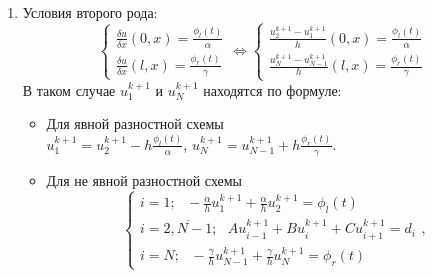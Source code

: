 \documentclass[12pt]{article}
\begin{document}
\begin{enumerate}
\begin{enumerate}
        \item Условия второго рода:
            \begin{equation*}
                \begin{cases}
                    \frac{\delta u}{\delta x}(0,x) = \frac{\phi_l(t)}{\alpha}
                    \\
                    \frac{\delta u}{\delta x}(l,x) = \frac{\phi_r(t)}{\gamma}
                \end{cases}
                \Leftrightarrow
                \begin{cases}
                    \frac{u_{2}^{k+1}-u_{1}^{k+1}}{h}(0,x) = \frac{\phi_l(t)}{\alpha}
                    \\
                    \frac{u_{N}^{k+1}-u_{N-1}^{k+1}}{h}(l,x) = \frac{\phi_r(t)}{\gamma}
                \end{cases}
            \end{equation*}
            В таком случае $u_1^{k+1}$ и $u_N^{k+1}$ находятся по формуле:
            \begin{itemize}
                \item Для явной разностной схемы\\
                $u_1^{k+1}=u_2^{k+1}-h\frac{\phi_l(t)}{\alpha}$, $u_N^{k+1}=u_{N-1}^{k+1}+h\frac{\phi_r(t)}{\gamma}$.
                \item Для не явной разностной схемы\\
                \begin{equation*}
                    \begin{cases}
                        i=1;\:\:\: -\frac{\alpha}{h}u_1^{k+1} +\frac{\alpha}{h}u_{2}^{k+1}=\phi_l(t)
                        \\
                        i=\overline{2,N-1};\:\:\:Au_{i-1}^{k+1} + Bu_i^{k+1} +Cu_{i+1}^{k+1}=d_i
                        \\
                        i=N;\:\:\: -\frac{\gamma}{h}u_{N-1}^{k+1} +\frac{\gamma}{h}u_{N}^{k+1}=\phi_r(t)
                    \end{cases},
                \end{equation*}
            \end{itemize}
        

\end{enumerate}
\end{enumerate}
\end{document}
